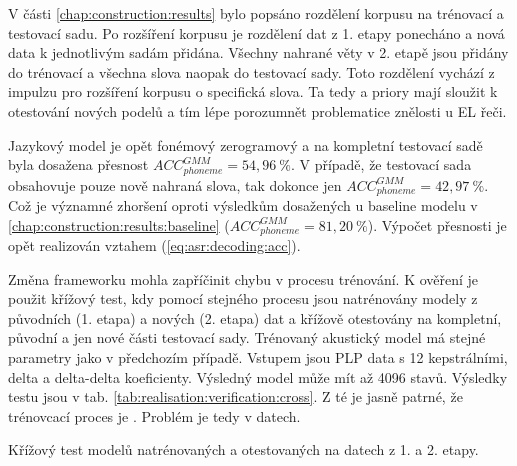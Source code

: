 V části \ref{chap:construction:results} bylo popsáno rozdělení korpusu na trénovací a testovací sadu. Po rozšíření korpusu je rozdělení dat z 1. etapy ponecháno a nová data k jednotlivým sadám přidána. Všechny nahrané věty v 2. etapě jsou přidány do trénovací a všechna slova naopak do testovací sady. Toto rozdělení vychází z impulzu pro rozšíření korpusu o specifická slova. Ta tedy a priory mají sloužit k otestování nových podelů a tím lépe porozumnět problematice znělosti u EL řeči.


Jazykový model je opět fonémový zerogramový a na kompletní testovací sadě byla dosažena přesnost $ACC_{phoneme}^{GMM} = 54,96\ \%$. V případě, že testovací sada obsahovuje pouze nově nahraná slova, tak dokonce jen $ACC_{phoneme}^{GMM} = 42,97\ \%$. Což je významné zhoršení oproti výsledkům dosažených u baseline modelu v \ref{chap:construction:results:baseline} ($ACC_{phoneme}^{GMM} = 81,20\ \%$). Výpočet přesnosti je opět realizován vztahem (\ref{eq:asr:decoding:acc}).

Změna frameworku mohla zapříčinit chybu v procesu trénování. K ověření je použit křížový test, kdy pomocí stejného procesu jsou natrénovány modely z původních (1. etapa) a nových (2. etapa) dat a křížově otestovány na kompletní, původní a jen nové části testovací sady. Trénovaný akustický model má stejné parametry jako v předchozím případě. Vstupem jsou PLP data s 12 kepstrálními, delta a delta-delta koeficienty. Výsledný model může mít až 4096 stavů. Výsledky testu jsou v tab. \ref{tab:realisation:verification:cross}. Z té je jasně patrné, že trénovcací proces je . Problém je tedy v datech.


\begin{table}[htpb]
  \centering
  \def\arraystretch{1.5}
  \caption{Křížový test modelů natrénovaných a otestovaných na datech z 1. a 2. etapy.}
  \label{tab:realisation:verification:cross}
\end{table}

